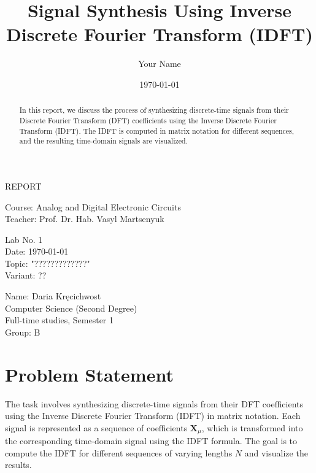 \documentclass[12pt]{article}
\title{Signal Synthesis Using Inverse Discrete Fourier Transform (IDFT)}
\author{Your Name}
\date{\today}
\begin{document}
\begin{titlepage}
    \centering
    \vspace*{2cm}
    
    \Huge
    REPORT
    
    \vspace{1cm}
    
    \Large
    Course: Analog and Digital Electronic Circuits \\
    Teacher: Prof. Dr. Hab. Vasyl Martsenyuk
    
    \vfill
    
    \Large
    Lab No. 1 \\
    Date: \today \\
    Topic: "?????????????" \\
    Variant: ??
    
    \vspace{1cm}
    
    \large
    Name: Daria Kręcichwost \\
    Computer Science (Second Degree) \\
    Full-time studies, Semester 1 \\
    Group: B
\end{titlepage}

\newpage

\maketitle

\begin{abstract}
In this report, we discuss the process of synthesizing discrete-time signals from their Discrete Fourier Transform (DFT) coefficients using the Inverse Discrete Fourier Transform (IDFT). The IDFT is computed in matrix notation for different sequences, and the resulting time-domain signals are visualized.
\end{abstract}

\section{Problem Statement}

The task involves synthesizing discrete-time signals from their DFT coefficients using the Inverse Discrete Fourier Transform (IDFT) in matrix notation. Each signal is represented as a sequence of coefficients \( \mathbf{X}_\mu \), which is transformed into the corresponding time-domain signal using the IDFT formula. The goal is to compute the IDFT for different sequences of varying lengths \( N \) and visualize the results.
\end{document}
